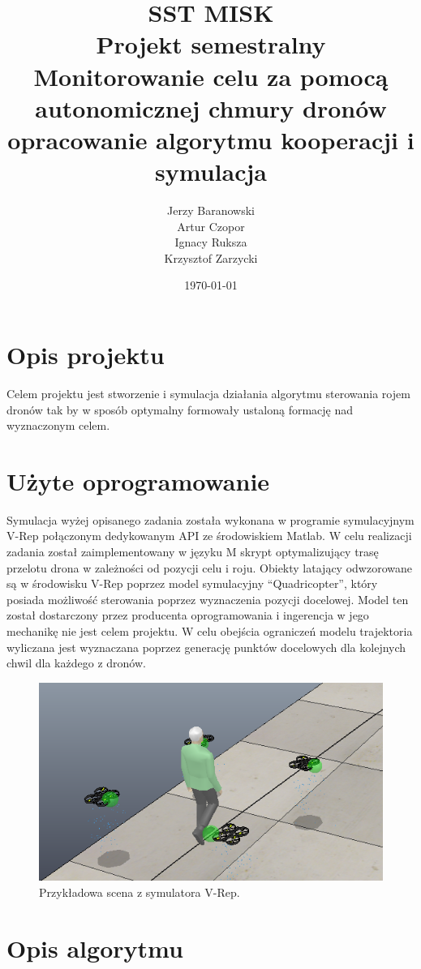 \documentclass[a4paper, 11pt, oneside]{article}
\title{%
  SST MISK \\Projekt semestralny \\
  \vspace{5mm}
  \large Monitorowanie celu za pomocą autonomicznej chmury dronów\\
  opracowanie algorytmu kooperacji i symulacja}
\author{Jerzy Baranowski\\Artur Czopor\\Ignacy Ruksza \\Krzysztof Zarzycki }
\date{\today}
\begin{document}
\maketitle
\newpage
\section{Opis projektu}
Celem projektu jest stworzenie i symulacja działania algorytmu sterowania rojem dronów tak by w sposób optymalny formowały ustaloną formację nad wyznaczonym celem. 
\section{Użyte oprogramowanie}

Symulacja wyżej opisanego zadania została wykonana w programie symulacyjnym V-Rep połączonym dedykowanym API ze środowiskiem Matlab. W celu realizacji zadania został zaimplementowany w języku M skrypt optymalizujący trasę przelotu drona w zależności od pozycji celu i roju.  Obiekty latający odwzorowane są w środowisku V-Rep poprzez model symulacyjny “Quadricopter”, który posiada możliwość sterowania poprzez wyznaczenia pozycji docelowej. Model ten został dostarczony przez producenta oprogramowania i ingerencja w jego mechanikę nie jest celem projektu. W celu obejścia ograniczeń modelu trajektoria wyliczana jest wyznaczana poprzez generację punktów docelowych dla kolejnych chwil dla każdego z dronów.

\begin{figure}[H]
\centering
\includegraphics[scale=0.5]{simulation1.png}
\caption{Przykładowa scena z symulatora V-Rep.}

\end{figure}

\section{Opis algorytmu}
\end{document}
